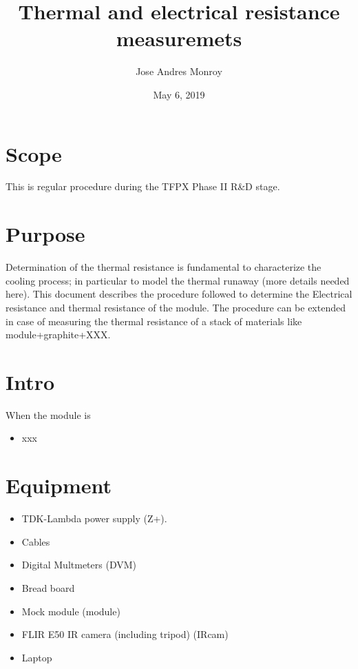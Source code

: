 \documentclass[12pt]{unlsilabsop}
\title{Thermal and electrical resistance measuremets}
\date{May 6, 2019}
\author{Jose Andres Monroy}
\begin{document}
\maketitle

\section{Scope}
This is regular procedure during the TFPX Phase II R\&D stage.

\section{Purpose}
Determination of the thermal resistance is fundamental to characterize the cooling process; in particular to model the thermal runaway (more details needed here). This document describes the procedure followed to determine the Electrical resistance and thermal resistance of the module. The procedure can be extended in case of measuring the thermal resistance of a stack of materials like module+graphite+XXX.


\section{Intro}
When the module is  
\begin{itemize}
    \item xxx
\end{itemize}

\section{Equipment}

\begin{itemize}
    \item TDK-Lambda power supply (Z+).  
    \item Cables
    \item Digital Multmeters (DVM)
    \item Bread board
    \item Mock module (module)
    \item FLIR E50 IR camera (including tripod) (IRcam)
    \item Laptop
\end{itemize}
\end{document}
